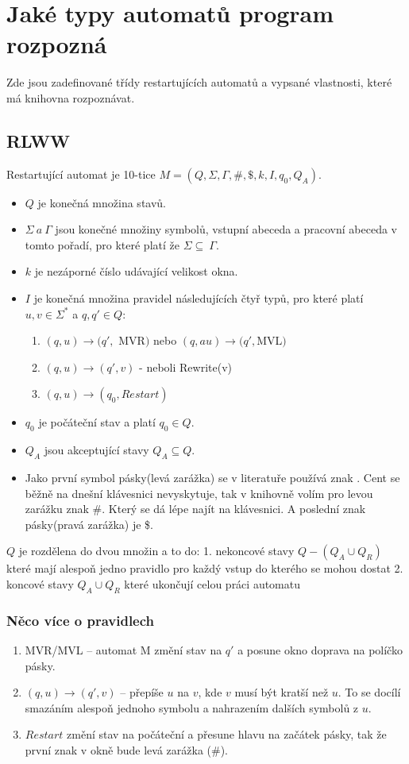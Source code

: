 \documentclass{article}
\begin{document}
\section{Jaké typy automatů program rozpozná}
Zde jsou zadefinované třídy restartujících automatů a vypsané vlastnosti, které má knihovna rozpoznávat.

\subsection{RLWW}
Restartující automat je 10-tice $M =  (Q ,\Sigma, \Gamma, \# , \$, k ,I ,q_0, Q_A)$.
\begin{itemize}
	\item  $Q$ je konečná množina stavů.
	\item  $\Sigma  \ a \ \Gamma$ jsou konečné množiny symbolů,
		vstupní abeceda a pracovní abeceda v tomto pořadí, pro které platí že $\Sigma  \subseteq \ \Gamma$.
	\item  $k$ je nezáporné číslo udávající velikost okna.
	\item  $I$ je konečná množina pravidel následujících čtyř typů, pro které platí $u, v \in \Sigma^\ast$ a $q, q' \in Q$:
		\begin{enumerate}
			\item $(q, u) \to (q',$ MVR$)$ nebo $(q, au) \to (q', $MVL$)$
			\item $(q, u)\to(q', v)$	- neboli Rewrite(v)
			\item $(q, u) \to (q_0, Restart)$
		\end{enumerate}
	\item  $q_0$ je počáteční stav a platí $q_0 \in Q$.
	\item  $Q_A$ jsou akceptující stavy $Q_A \subseteq Q$.
	\item  Jako první symbol pásky(levá zarážka) se v literatuře používá znak \cent.
	Cent se běžně na dnešní klávesnici nevyskytuje, tak v knihovně volím pro levou zarážku znak \#.
	Který se dá lépe najít na klávesnici.
	A poslední znak pásky(pravá zarážka) je \$.
\end{itemize}

$Q$ je rozdělena do dvou množin a to do:
1. nekoncové stavy $Q - (Q_A \cup Q_R)$ které mají alespoň jedno pravidlo pro každý vstup do kterého se mohou dostat
2. koncové stavy $Q_A \cup Q_R$ které ukončují celou práci automatu

\subsubsection{Něco více o pravidlech}
\begin{enumerate}
	\item MVR/MVL -- automat M změní stav na $q'$ a posune okno doprava na políčko pásky.
	\item $(q, u)\to(q', v)$ -- přepíše $u$ na $v$, kde $v$ musí být kratší než $u$.
	To se docílí smazáním alespoň jednoho symbolu a nahrazením dalších symbolů z $u$.
	\item  $Restart$ změní stav na počáteční a přesune hlavu na začátek pásky, tak že první znak v okně bude levá zarážka (\#).
\end{enumerate}
\end{document}
